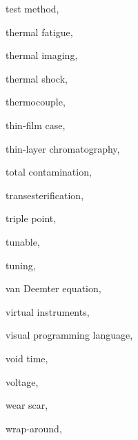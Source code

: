 \begin{theindex}
  \item \lowercase {test method}, 
  \item \lowercase {thermal fatigue}, 
  \item \lowercase {thermal imaging}, 
  \item \lowercase {thermal shock}, 
  \item \lowercase {thermocouple}, 
  \item \lowercase {thin-film case}, 
  \item \lowercase {thin-layer chromatography}, 
  \item \lowercase {total contamination}, 
  \item \lowercase {transesterification}, 
  \item \lowercase {triple point}, 
  \item \lowercase {tunable}, 
  \item \lowercase {tuning}, 
  \item  {van Deemter equation}, 
  \item \lowercase {virtual instruments}, 
  \item \lowercase {visual programming language}, 
  \item \lowercase {void time}, 
  \item \lowercase {voltage}, 
  \item \lowercase {wear scar}, 
  \item \lowercase {wrap-around}, 

\end{theindex}
